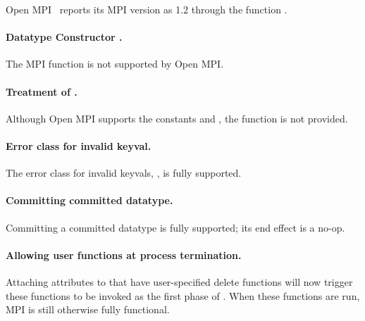 Open MPI \lamversion\ reports its MPI version as 1.2 through the function
.


\paragraph{Datatype Constructor .}

The MPI function 
is not supported by Open MPI.


\paragraph{Treatment of .}

Although Open MPI supports the constants 
and , the function
 is not provided.


\paragraph{Error class for invalid keyval.}

The error class for invalid keyvals, ,
is fully supported.


\paragraph{Committing committed datatype.}

Committing a committed datatype is fully supported; its end effect is
a no-op.


\paragraph{Allowing user functions at process termination.}

Attaching attributes to  that have
user-specified delete functions will now trigger these functions to be
invoked as the first phase of .  When these
functions are run, MPI is still otherwise fully functional.



